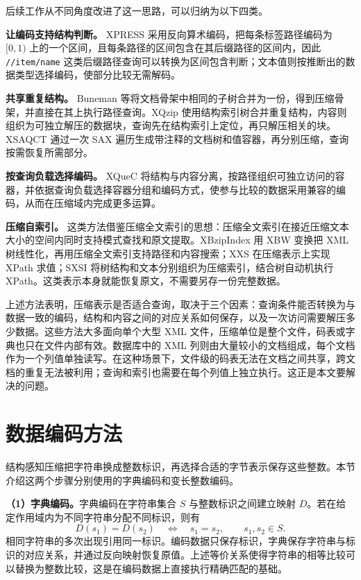 后续工作从不同角度改进了这一思路，可以归纳为以下四类。

\textbf{让编码支持结构判断。} XPRESS 采用反向算术编码，把每条标签路径编码为 $[0,1)$ 上的一个区间，且每条路径的区间包含在其后缀路径的区间内，因此 \texttt{//item/name} 这类后缀路径查询可以转换为区间包含判断；文本值则按推断出的数据类型选择编码，使部分比较无需解码\cite{min2003xpress}。

\textbf{共享重复结构。} Buneman 等将文档骨架中相同的子树合并为一份，得到压缩骨架，并直接在其上执行路径查询\cite{buneman2003path}。XQzip 使用结构索引树合并重复结构，内容则组织为可独立解压的数据块，查询先在结构索引上定位，再只解压相关的块\cite{cheng2004xqzip}。XSAQCT 通过一次 SAX 遍历生成带注释的文档树和值容器，再分别压缩，查询按需恢复所需部分\cite{muldner2009xsaqct}。

\textbf{按查询负载选择编码。} XQueC 将结构与内容分离，按路径组织可独立访问的容器，并依据查询负载选择容器分组和编码方式，使参与比较的数据采用兼容的编码，从而在压缩域内完成更多运算\cite{arion2007xquec}。

\textbf{压缩自索引。} 这类方法借鉴压缩全文索引的思想：压缩全文索引在接近压缩文本大小的空间内同时支持模式查找和原文提取\cite{navarro2007compressed}。XBzipIndex 用 XBW 变换把 XML 树线性化，再用压缩全文索引支持路径和内容搜索\cite{ferragina2006compressing}；XXS 在压缩表示上实现 XPath 求值\cite{brisaboa2014xxs}；SXSI 将树结构和文本分别组织为压缩索引，结合树自动机执行 XPath\cite{arroyuelo2015fast}。这类表示本身就能恢复原文，不需要另存一份完整数据。

上述方法表明，压缩表示是否适合查询，取决于三个因素：查询条件能否转换为与数据一致的编码，结构和内容之间的对应关系如何保存，以及一次访问需要解压多少数据。这些方法大多面向单个大型 XML 文件，压缩单位是整个文件，码表或字典也只在文件内部有效。数据库中的 XML 列则由大量较小的文档组成，每个文档作为一个列值单独读写。在这种场景下，文件级的码表无法在文档之间共享，跨文档的重复无法被利用；查询和索引也需要在每个列值上独立执行。这正是本文要解决的问题。

\section{数据编码方法}

结构感知压缩把字符串换成整数标识，再选择合适的字节表示保存这些整数。本节介绍这两个步骤分别使用的字典编码和变长整数编码。

\textbf{（1）字典编码。}字典编码在字符串集合 $S$ 与整数标识之间建立映射 $D$。若在给定作用域内为不同字符串分配不同标识，则有
\[
D(s_1)=D(s_2)\quad\Longleftrightarrow\quad s_1=s_2,\qquad s_1,s_2\in S.
\]
相同字符串的多次出现引用同一标识。编码数据只保存标识，字典保存字符串与标识的对应关系，并通过反向映射恢复原值。上述等价关系使得字符串的相等比较可以替换为整数比较，这是在编码数据上直接执行精确匹配的基础。

